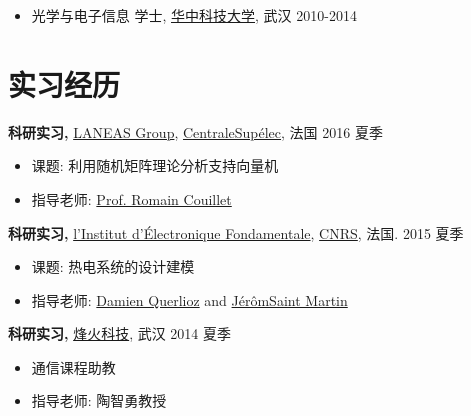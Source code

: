 \documentclass[margin]{res}
\begin{document}
\begin{CJK}{UTF8}{gbsn}
\begin{resume}
\begin{itemize}
\item 光学与电子信息 学士, \href{http://www.hust.edu.cn/}{华中科技大学}, 武汉 \hfill 2010-2014
\end{itemize}

\section{实习经历}

 {\bf 科研实习,} \href{http://www.laneas.com/}{LANEAS Group}, \href{http://www.centralesupelec.fr}{CentraleSup\'elec}, 法国 \hfill 2016 夏季

 \begin{itemize} %
 \item 课题: 利用随机矩阵理论分析支持向量机
 \item 指导老师: \href{http://romaincouillet.hebfree.org/}{Prof. Romain Couillet}
 \end{itemize}

 {\bf 科研实习,} \href{http://www.ief.u-psud.fr/}{l’Institut d’\'Electronique Fondamentale}, \href{http://www.cnrs.fr/}{CNRS}, 法国. \hfill 2015 夏季

 \begin{itemize} %
 \item 课题: 热电系统的设计建模
 \item 指导老师: \href{https://sites.google.com/site/damienquerlioz/}{Damien Querlioz} and \href{http://computational-electronics.ief.u-psud.fr/?page_id=670}{JérômSaint Martin}
 \end{itemize}

 {\bf 科研实习,} \href{http://www.fiberhomegroup.com}{烽火科技}, 武汉 \hfill 2014 夏季

 \begin{itemize} %
 \item 通信课程助教 
 \item 指导老师: 陶智勇教授
 \end{itemize}



\end{resume}
\end{CJK}
\end{document}
